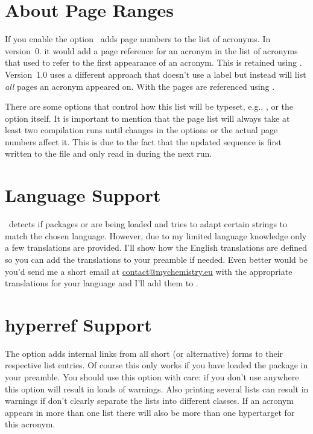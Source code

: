 \documentclass[load-preamble+]{cnltx-doc}
\makeatletter
\newcommand\versionstar{\texorpdfstring{\@versionstar}{*}}
\makeatother
\begin{document}
\section{About Page Ranges}
If you enable the  option \acro\ adds page numbers to the list
of acronyms.  In version~0.\versionstar{} it would add a page reference for an
acronym in the list of acronyms that used  to refer to the first
appearance of an acronym.  This is retained using .
Version~1.0 uses a different approach that doesn't use a label but instead
will list \emph{all} pages an acronym appeared on.  With  the
pages are referenced using .

There are some options that control how this list will be typeset, e.g.,
,  or the option 
itself.  It is important to mention that the page list will always take at
least two compilation runs until changes in the options or the actual page
numbers affect it.  This is due to the fact that the updated sequence is first
written to the  file and only read in during the next run.


\section{Language Support}
\acro\ detects if packages  or  are being loaded
and tries to adapt certain strings to match the chosen language.  However, due
to my limited language knowledge only a few translations are provided.  I'll
show how the English translations are defined so you can add the translations
to your preamble if needed.  Even better would be you'd send me a short email
at \href{mailto:contact@mychemistry.eu}{contact@mychemistry.eu} with the
appropriate translations for your language and I'll add them to \acro.

\begin{sourcecode}
\end{sourcecode}

\section{hyperref Support}
The option  adds internal links from all short (or
alternative) forms to their respective list entries.  Of course this only
works if you have loaded the  package in your preamble.  You
should use this option with care: if you don't use  anywhere
this option will result in loads of  warnings.  Also printing
several lists can result in warnings if don't clearly separate the lists into
different classes.  If an acronym appears in more than one list there will
also be more than one hypertarget for this acronym.
\end{document}
